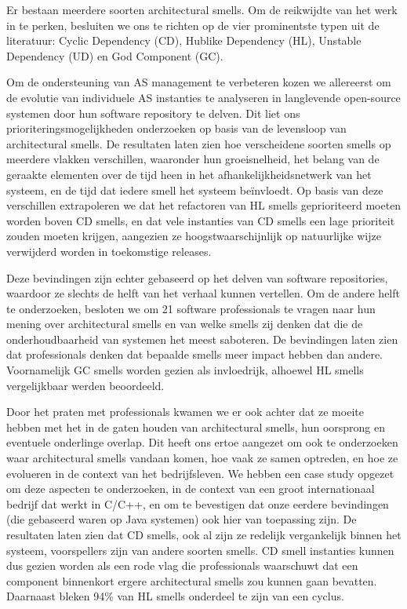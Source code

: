{Er bestaan meerdere soorten architectural smells. Om de reikwijdte van het werk in te perken, besluiten we ons te richten op de vier prominentste typen uit de literatuur: Cyclic Dependency (CD), Hublike Dependency (HL), Unstable Dependency (UD) en God Component (GC).

Om de ondersteuning van AS management te verbeteren kozen we allereerst om de evolutie van individuele AS instanties te analyseren in langlevende open-source systemen door hun software repository te delven. Dit liet ons prioriteringsmogelijkheden onderzoeken op basis van de levensloop van architectural smells. De resultaten laten zien hoe verscheidene soorten smells op meerdere vlakken verschillen, waaronder hun groeisnelheid, het belang van de geraakte elementen over de tijd heen in het afhankelijkheidsnetwerk van het systeem, en de tijd dat iedere smell het systeem beïnvloedt. Op basis van deze verschillen extrapoleren we dat het refactoren van HL smells geprioriteerd moeten worden boven CD smells, en dat vele instanties van CD smells een lage prioriteit zouden moeten krijgen, aangezien ze hoogstwaarschijnlijk op natuurlijke wijze verwijderd worden in toekomstige releases.

Deze bevindingen zijn echter gebaseerd op het delven van software repositories, waardoor ze slechts de helft van het verhaal kunnen vertellen. Om de andere helft te onderzoeken, besloten we om 21 software professionals te vragen naar hun mening over architectural smells en van welke smells zij denken dat die de onderhoudbaarheid van systemen het meest saboteren. De bevindingen laten zien dat professionals denken dat bepaalde smells meer impact hebben dan andere. Voornamelijk GC smells worden gezien als invloedrijk, alhoewel HL smells vergelijkbaar werden beoordeeld.

Door het praten met professionals kwamen we er ook achter dat ze moeite hebben met het in de gaten houden van architectural smells, hun oorsprong en eventuele onderlinge overlap. Dit heeft ons ertoe aangezet om ook te onderzoeken waar architectural smells vandaan komen, hoe vaak ze samen optreden, en hoe ze evolueren in de context van het bedrijfsleven. We hebben een case study opgezet om deze aspecten te onderzoeken, in de context van een groot internationaal bedrijf dat werkt in C/C++, en om te bevestigen dat onze eerdere bevindingen (die gebaseerd waren op Java systemen) ook hier van toepassing zijn. De resultaten laten zien dat CD smells, ook al zijn ze redelijk vergankelijk binnen het systeem, voorspellers zijn van andere soorten smells. CD smell instanties kunnen dus gezien worden als een rode vlag die professionals waarschuwt dat een component binnenkort ergere architectural smells zou kunnen gaan bevatten. Daarnaast bleken 94\% van HL smells onderdeel te zijn van een cyclus. 

}
